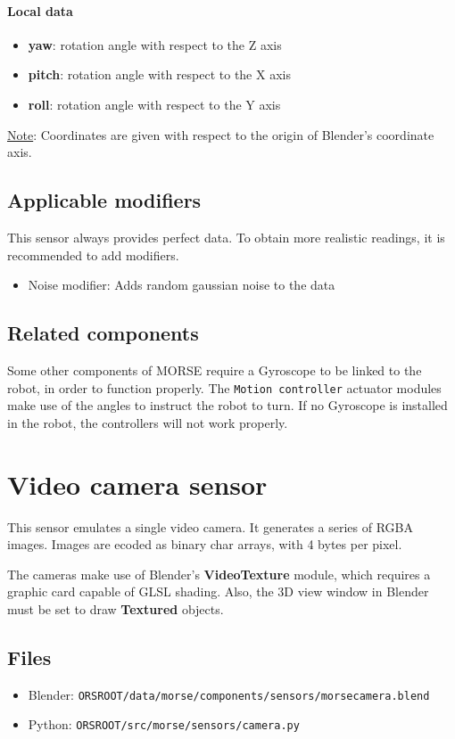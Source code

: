 \documentclass[twoside,a4paper,10pt]{report}
\newcommand{\dokutitlelevelone}[1]{\chapter{#1}}
\newcommand{\dokutitleleveltwo}[1]{\section{#1}}
\newcommand{\dokutitlelevelfour}[1]{\subsubsection{#1}}
\newcommand{\dokubold}[1]{\textbf{#1}}
\newcommand{\dokumonospace}[1]{\texttt{#1}}
\newcommand{\dokuunderline}[1]{\underline{#1}}
\newcommand{\dokuitem}{\item}
\begin{document}
\dokutitlelevelfour{Local data}

\begin{itemize}
\dokuitem  \dokubold{yaw}: rotation angle with respect to the Z axis
\dokuitem  \dokubold{pitch}: rotation angle with respect to the X axis
\dokuitem  \dokubold{roll}: rotation angle with respect to the Y axis
\end{itemize}

\dokuunderline{Note}: Coordinates are given with respect to the origin of Blender's coordinate axis.


\dokutitleleveltwo{Applicable modifiers}
\label{e70c0c8fd69fbf29dc4de09110825004}%

This sensor always provides perfect data.
To obtain more realistic readings, it is recommended to add modifiers.



\begin{itemize}
\dokuitem  Noise modifier: Adds random gaussian noise to the data
\end{itemize}

\dokutitleleveltwo{Related components}
\label{72610f0a0494668833b2c5de69dd5e02}%

Some other components of MORSE require a Gyroscope to be linked to the robot, in order to function properly. The \dokumonospace{Motion controller} actuator modules make use of the angles to instruct the robot to turn. If no Gyroscope is installed in the robot, the controllers will not work properly.


\dokutitlelevelone{Video camera sensor}
\label{2157f6689a9fa010e655f615edf5281d}%
\label{dd6d2dcc679d12b9430a9787bab45b33}%

This sensor emulates a single video camera. It generates a series of RGBA images. Images are ecoded as binary char arrays, with 4 bytes per pixel.

The cameras make use of Blender's \dokubold{VideoTexture} module, which requires a graphic card capable of GLSL shading. Also, the 3D view window in Blender must be set to draw \dokubold{Textured} objects.


\dokutitleleveltwo{Files}
\label{45b963397aa40d4a0063e0d85e4fe7a1}%

\begin{itemize}
\dokuitem  Blender: \dokumonospace{{\textdollar}ORS{\textunderscore}ROOT/data/morse/components/sensors/morse{\textunderscore}camera.blend}
\dokuitem  Python: \dokumonospace{{\textdollar}ORS{\textunderscore}ROOT/src/morse/sensors/camera.py}
\end{itemize}
\end{document}
